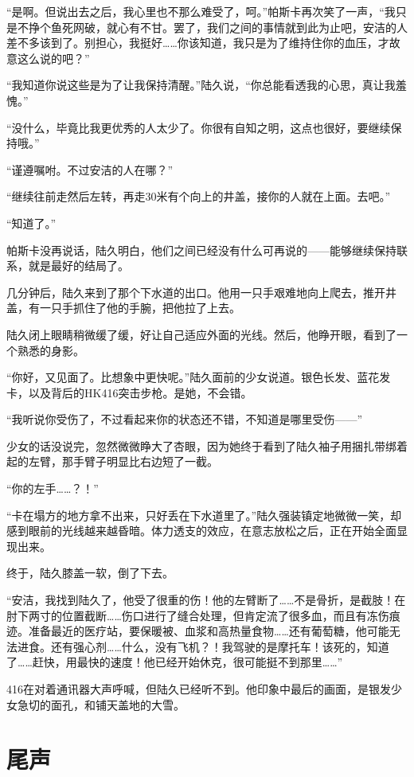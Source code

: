 “是啊。但说出去之后，我心里也不那么难受了，呵。”帕斯卡再次笑了一声，“我只是不挣个鱼死网破，就心有不甘。罢了，我们之间的事情就到此为止吧，安洁的人差不多该到了。别担心，我挺好……你该知道，我只是为了维持住你的血压，才故意这么说的吧？”

“我知道你说这些是为了让我保持清醒。”陆久说，“你总能看透我的心思，真让我羞愧。”

“没什么，毕竟比我更优秀的人太少了。你很有自知之明，这点也很好，要继续保持哦。”

“谨遵嘱咐。不过安洁的人在哪？”

“继续往前走然后左转，再走30米有个向上的井盖，接你的人就在上面。去吧。”

“知道了。”

帕斯卡没再说话，陆久明白，他们之间已经没有什么可再说的——能够继续保持联系，就是最好的结局了。

几分钟后，陆久来到了那个下水道的出口。他用一只手艰难地向上爬去，推开井盖，有一只手抓住了他的手腕，把他拉了上去。

陆久闭上眼睛稍微缓了缓，好让自己适应外面的光线。然后，他睁开眼，看到了一个熟悉的身影。

“你好，又见面了。比想象中更快呢。”陆久面前的少女说道。银色长发、蓝花发卡，以及背后的HK416突击步枪。是她，不会错。

“我听说你受伤了，不过看起来你的状态还不错，不知道是哪里受伤——”

少女的话没说完，忽然微微睁大了杏眼，因为她终于看到了陆久袖子用捆扎带绑着起的左臂，那手臂子明显比右边短了一截。

“你的左手……？！”

“卡在塌方的地方拿不出来，只好丢在下水道里了。”陆久强装镇定地微微一笑，却感到眼前的光线越来越昏暗。体力透支的效应，在意志放松之后，正在开始全面显现出来。

终于，陆久膝盖一软，倒了下去。

“安洁，我找到陆久了，他受了很重的伤！他的左臂断了……不是骨折，是截肢！在肘下两寸的位置截断……伤口进行了缝合处理，但肯定流了很多血，而且有冻伤痕迹。准备最近的医疗站，要保暖被、血浆和高热量食物……还有葡萄糖，他可能无法进食。还有强心剂……什么，没有飞机？！我驾驶的是摩托车！该死的，知道了……赶快，用最快的速度！他已经开始休克，很可能挺不到那里……”

416在对着通讯器大声呼喊，但陆久已经听不到。他印象中最后的画面，是银发少女急切的面孔，和铺天盖地的大雪。

\section*{尾声}

